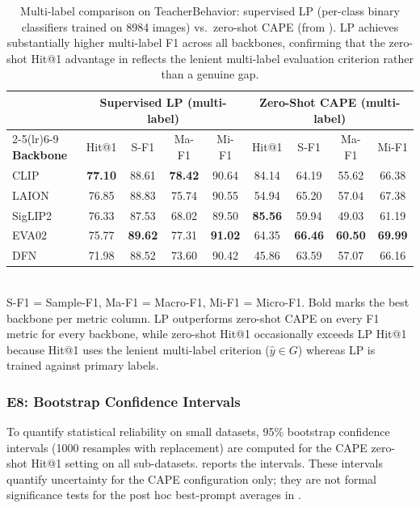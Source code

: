 \documentclass[symmetry,article,submit,pdftex,moreauthors]{Definitions/mdpi}
\begin{document}
\begin{table}[H]
\caption{Multi-label comparison on TeacherBehavior: supervised LP (per-class binary classifiers trained on 8984 images) vs.\ zero-shot CAPE (from ). LP achieves substantially higher multi-label F1 across all backbones, confirming that the zero-shot Hit@1 advantage in  reflects the lenient multi-label evaluation criterion rather than a genuine gap.}
\label{tab:linear_probe_ml}
\centering
\small
\setlength{\tabcolsep}{3.5pt}
\begin{tabular}{l cccc cccc}
\toprule
 & \multicolumn{4}{c}{\textbf{Supervised LP (multi-label)}} & \multicolumn{4}{c}{\textbf{Zero-Shot CAPE (multi-label)}} \\
\cmidrule(lr){2-5}\cmidrule(lr){6-9}
\textbf{Backbone} & Hit@1 & S-F1 & Ma-F1 & Mi-F1 & Hit@1 & S-F1 & Ma-F1 & Mi-F1 \\
\midrule
CLIP & \textbf{77.10} & 88.61 & \textbf{78.42} & 90.64 & 84.14 & 64.19 & 55.62 & 66.38 \\
LAION & 76.85 & 88.83 & 75.74 & 90.55 & 54.94 & 65.20 & 57.04 & 67.38 \\
SigLIP2 & 76.33 & 87.53 & 68.02 & 89.50 & \textbf{85.56} & 59.94 & 49.03 & 61.19 \\
EVA02 & 75.77 & \textbf{89.62} & 77.31 & \textbf{91.02} & 64.35 & \textbf{66.46} & \textbf{60.50} & \textbf{69.99} \\
DFN & 71.98 & 88.52 & 73.60 & 90.42 & 45.86 & 63.59 & 57.07 & 66.16 \\
\bottomrule
\end{tabular}
\\[3pt]
{\footnotesize S-F1 = Sample-F1, Ma-F1 = Macro-F1, Mi-F1 = Micro-F1. Bold marks the best backbone per metric column. LP outperforms zero-shot CAPE on every F1 metric for every backbone, while zero-shot Hit@1 occasionally exceeds LP Hit@1 because Hit@1 uses the lenient multi-label criterion ($\hat{y}\in G$) whereas LP is trained against primary labels.}
\end{table}


\subsubsection{E8: Bootstrap Confidence Intervals}
\label{sec:e8_bootstrap}

To quantify statistical reliability on small datasets, 95\% bootstrap confidence intervals (1000 resamples with replacement) are computed for the CAPE zero-shot Hit@1 setting on all sub-datasets.  reports the intervals. These intervals quantify uncertainty for the CAPE configuration only; they are not formal significance tests for the post hoc best-prompt averages in .
\end{document}
